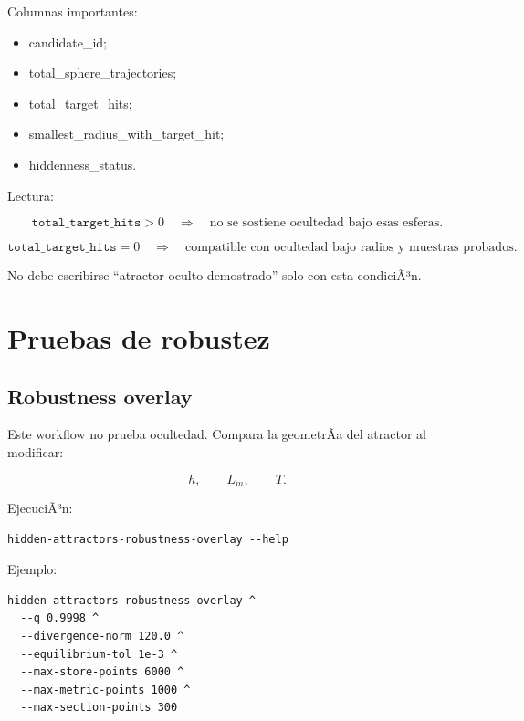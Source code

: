 \documentclass[11pt]{article}
\DeclareRobustCommand{\codepath}[1]{\begingroup\Urlmuskip=0mu plus 2mu\path{#1}\endgroup}
\def\codepath#1{#1}%
\begin{document}
Columnas importantes:

\begin{itemize}
\item \codepath{candidate_id};
\item \codepath{total_sphere_trajectories};
\item \codepath{total_target_hits};
\item \codepath{smallest_radius_with_target_hit};
\item \codepath{hiddenness_status}.
\end{itemize}

Lectura:

\begin{equation}
\texttt{total\_target\_hits}>0
\quad\Longrightarrow\quad
\text{no se sostiene ocultedad bajo esas esferas}.
\end{equation}

\begin{equation}
\texttt{total\_target\_hits}=0
\quad\Longrightarrow\quad
\text{compatible con ocultedad bajo radios y muestras probados}.
\end{equation}

No debe escribirse ``atractor oculto demostrado'' solo con esta condiciÃ³n.

\section{Pruebas de robustez}

\subsection{Robustness overlay}

Este workflow no prueba ocultedad. Compara la geometrÃ­a del atractor al modificar:

\begin{equation}
h,\qquad L_m,\qquad T.
\end{equation}

EjecuciÃ³n:

\begin{lstlisting}
hidden-attractors-robustness-overlay --help
\end{lstlisting}

Ejemplo:

\begin{lstlisting}
hidden-attractors-robustness-overlay ^
  --q 0.9998 ^
  --divergence-norm 120.0 ^
  --equilibrium-tol 1e-3 ^
  --max-store-points 6000 ^
  --max-metric-points 1000 ^
  --max-section-points 300
\end{lstlisting}
\end{document}
